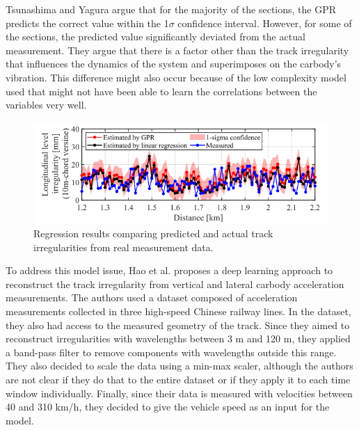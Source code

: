 Tsunashima and Yagura argue that for the majority of the sections, the GPR predicts the correct value within the 1$\sigma$ confidence interval. However, for some of the sections, the predicted value significantly deviated from the actual measurement. They argue that there is a factor other than the track irregularity that influences the dynamics of the system and superimposes on the carbody's vibration. This difference might also occur because of the low complexity model used that might not have been able to learn the correlations between the variables very well. 

\begin{figure}[H]
    \centering
    \includegraphics[width=12cm]{Cap2_LitReview/Track_Quality_Accel/Tsunashina (2024)/Results.png}
    \caption{Regression results comparing predicted and actual track irregularities from real measurement data. \cite{vibration7040049}}
    \label{fig:Tsunashina_Results}
\end{figure}

To address this model issue, Hao et al. \cite{Hao02012023} proposes a deep learning approach to reconstruct the track irregularity from vertical and lateral carbody acceleration measurements. The authors used a dataset composed of acceleration measurements collected in three high-speed Chinese railway lines. In the dataset, they also had access to the measured geometry of the track. Since they aimed to reconstruct irregularities with wavelengths between 3 m and 120 m, they applied a band-pass filter to remove components with wavelengths outside this range. They also decided to scale the data using a min-max scaler, although the authors are not clear if they do that to the entire dataset or if they apply it to each time window individually. Finally, since their data is measured with velocities between 40 and 310 km/h, they decided to give the vehicle speed as an input for the model.

